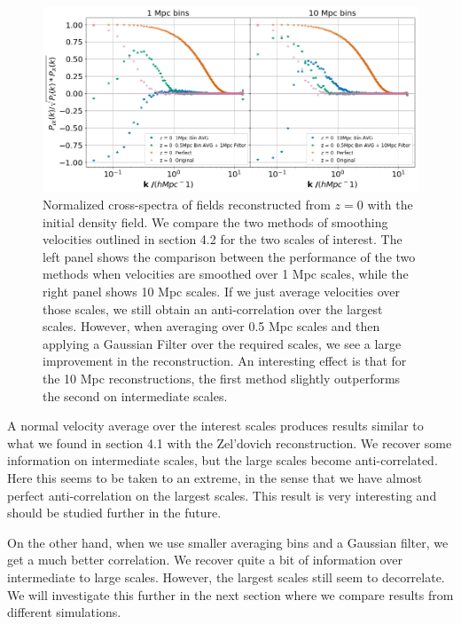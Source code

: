 \begin{figure}
    \centering
    \includegraphics[width=1\columnwidth]{images/realRecon/filterComp.png}%
    
    \caption{
        Normalized cross-spectra of fields reconstructed from $z=0$ with the initial density field. We compare the two methods of smoothing velocities outlined in section 4.2 for the two scales of interest. The left panel shows the comparison between the performance of the two methods when velocities are smoothed over 1 Mpc scales, while the right panel shows 10 Mpc scales. If we just average velocities over those scales, we still obtain an anti-correlation over the largest scales. However, when averaging over 0.5 Mpc scales and then applying a Gaussian Filter over the required scales, we see a large improvement in the reconstruction. An interesting effect is that for the 10 Mpc reconstructions, the first method slightly outperforms the second on intermediate scales. 
    }
    
    \label{fig:4.3}
\end{figure}

A normal velocity average over the interest scales produces results similar to what we found in section 4.1 with the Zel'dovich reconstruction. We recover some information on intermediate scales, but the large scales become anti-correlated. Here this seems to be taken to an extreme, in the sense that we have almost perfect anti-correlation on the largest scales. This result is very interesting and should be studied further in the future.

On the other hand, when we use smaller averaging bins and a Gaussian filter, we get a much better correlation. We recover quite a bit of information over intermediate to large scales. However, the largest scales still seem to decorrelate. We will investigate this further in the next section where we compare results from different simulations. 

